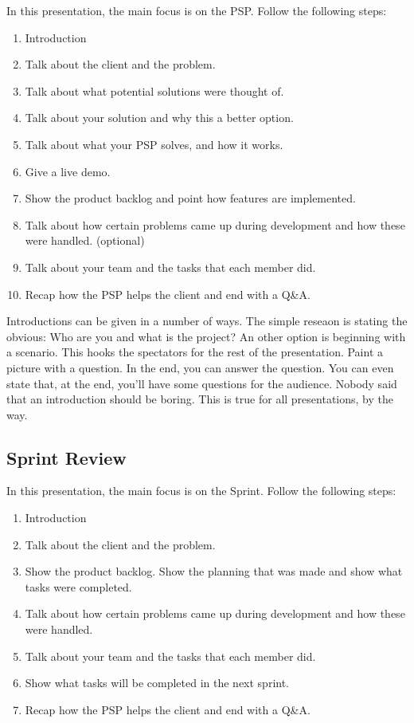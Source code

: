 \documentclass[10pt]{report}
\begin{document}
In this presentation, the main focus is on the PSP. Follow the following steps:

\begin{enumerate}
	\item Introduction
	\item Talk about the client and the problem.
	\item Talk about what potential solutions were thought of.
	\item Talk about your solution and why this a better option.
	\item Talk about what your PSP solves, and how it works.
	\item Give a live demo.
	\item Show the product backlog and point how features are implemented.
	\item Talk about how certain problems came up during development and how these were handled. (optional)
	\item Talk about your team and the tasks that each member did.
	\item Recap how the PSP helps the client and end with a Q\&A.
\end{enumerate}

\noindent Introductions can be given in a number of ways. The simple reseaon is stating the obvious: Who are you and what is the project? An other option is beginning with a scenario. This hooks the spectators for the rest of the presentation. Paint a picture with a question. In the end, you can answer the question. You can even state that, at the end, you'll have some questions for the audience. Nobody said that an introduction should be boring. This is true for all presentations, by the way.

\subsection{Sprint Review}

In this presentation, the main focus is on the Sprint. Follow the following steps:

\begin{enumerate}
	\item Introduction
	\item Talk about the client and the problem.
	\item Show the product backlog. Show the planning that was made and show what tasks were completed.
	\item Talk about how certain problems came up during development and how these were handled.
	\item Talk about your team and the tasks that each member did.
	\item Show what tasks will be completed in the next sprint.
	\item Recap how the PSP helps the client and end with a Q\&A.
\end{enumerate}
\end{document}
